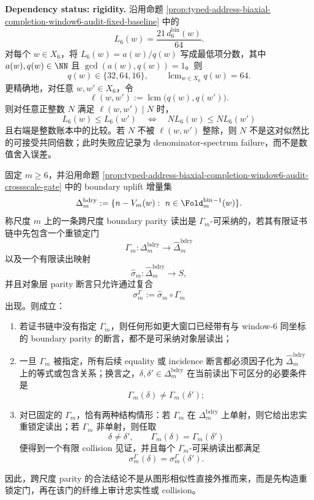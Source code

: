 \begin{proposition}\label{prop:distill-euclid-elements-window6-likelihood-allmultiples-audit}
\textbf{Dependency status: rigidity.}
沿用命题 \ref{prop:typed-address-biaxial-completion-window6-audit-fixed-baseline} 中的
\[
L_6(w)=\frac{21\,d_6^{\mathrm{bin}}(w)}{64}.
\]
对每个 \(w\in X_6\)，将 \(L_6(w)=a(w)/q(w)\) 写成最低项分数，其中 \(a(w),q(w)\in\NN\) 且 \(\gcd(a(w),q(w))=1\)。则
\[
q(w)\in\{32,64,16\},
\qquad
\operatorname{lcm}_{w\in X_6}q(w)=64.
\]
更精确地，对任意 \(w,w'\in X_6\)，令
\[
\ell(w,w'):=\operatorname{lcm}\bigl(q(w),q(w')\bigr).
\]
则对任意正整数 \(N\) 满足 \(\ell(w,w')\mid N\) 时，
\[
L_6(w)\le L_6(w')
\quad\Longleftrightarrow\quad
N L_6(w)\le N L_6(w')
\]
且右端是整数账本中的比较。若 \(N\) 不被 \(\ell(w,w')\) 整除，则 \(N\) 不是这对似然比的可接受共同倍数；此时失败应记录为 denominator-spectrum failure，而不是数值舍入误差。
\end{proposition}

\begin{proposition}\label{distill:euclid_elements-finite_construction_certificate_families-crossscale-relocking-normal-form}
固定 \(m\ge 6\)，并沿用命题 \ref{prop:typed-address-biaxial-completion-window6-audit-crossscale-gate} 中的 boundary uplift 增量集
\[
\Delta_m^{\mathrm{bdry}}
:=
\{n-V_m(w):\ n\in \Fold_m^{\mathrm{bin}}{}^{-1}(w)\}.
\]
称尺度 \(m\) 上的一条跨尺度 boundary parity 读出是 \(\Gamma_m\)-可采纳的，若其有限证书链中先包含一个重锁定门
\[
\Gamma_m:\Delta_m^{\mathrm{bdry}}\longrightarrow \widehat\Delta_m^{\mathrm{bdry}}
\]
以及一个有限读出映射
\[
\widehat\sigma_m:\widehat\Delta_m^{\mathrm{bdry}}\longrightarrow S,
\]
并且对象层 parity 断言只允许通过复合
\[
\sigma_m^{\Gamma}:=\widehat\sigma_m\circ\Gamma_m
\]
出现。则成立：
\begin{enumerate}
  \item 若证书链中没有指定 \(\Gamma_m\)，则任何形如更大窗口已经带有与 window-\(6\) 同坐标的 boundary parity 的断言，都不是可采纳对象层读出；
  \item 一旦 \(\Gamma_m\) 被指定，所有后续 equality 或 incidence 断言都必须因子化为 \(\widehat\Delta_m^{\mathrm{bdry}}\) 上的等式或包含关系；换言之，\(\delta,\delta'\in\Delta_m^{\mathrm{bdry}}\) 在当前读出下可区分的必要条件是
  \[
  \Gamma_m(\delta)\ne \Gamma_m(\delta');
  \]
  \item 对已固定的 \(\Gamma_m\)，恰有两种结构情形：若 \(\Gamma_m\) 在 \(\Delta_m^{\mathrm{bdry}}\) 上单射，则它给出忠实重锁定读出；若 \(\Gamma_m\) 非单射，则任取
  \[
  \delta\ne\delta',\qquad \Gamma_m(\delta)=\Gamma_m(\delta')
  \]
  便得到一个有限 collision 见证，并且每个 \(\Gamma_m\)-可采纳读出都满足
  \[
  \sigma_m^{\Gamma}(\delta)=\sigma_m^{\Gamma}(\delta').
  \]
\end{enumerate}
因此，跨尺度 parity 的合法结论不是从图形相似性直接外推而来，而是先构造重锁定门，再在该门的纤维上审计忠实性或 collision。
\end{proposition}


